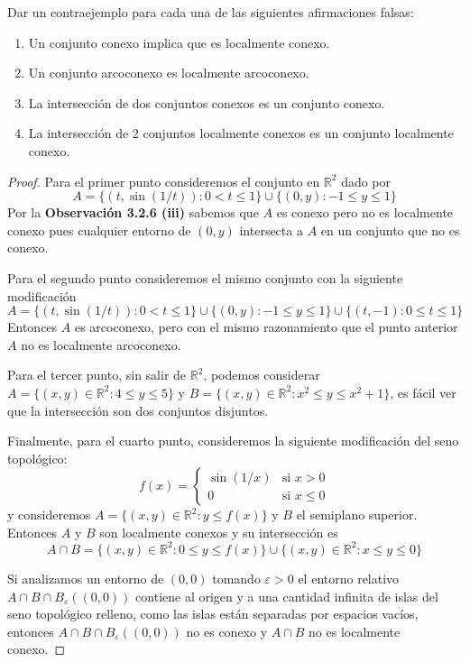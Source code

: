 \documentclass{article}
\theoremstyle{definition}
\newcommand{\R}{\mathbb{R}}
\newenvironment{ejercicio}[1]{\begin{trivlist}
\item[\hskip \labelsep {\bfseries Ejercicio}\hskip \labelsep {\bfseries #1.}]}{\end{trivlist}}
\begin{document}
\begin{ejercicio}{5}
    Dar un contraejemplo para cada una de las siguientes afirmaciones falsas:
    \begin{enumerate}
        \item Un conjunto conexo implica que es localmente conexo.
        \item Un conjunto arcoconexo es localmente arcoconexo.
        \item La intersección de dos conjuntos conexos es un conjunto conexo.
        \item La intersección de 2 conjuntos localmente conexos es un conjunto localmente conexo.
    \end{enumerate}
\end{ejercicio}
\begin{proof}
    Para el primer punto consideremos el conjunto en \( \R^2 \) dado por \[ A = \{ (t, \sin(1/t)) : 0 < t \leq 1 \} \cup \{ (0, y) : -1 \leq y \leq 1 \} \] Por la \textbf{Observación 3.2.6 (iii)} sabemos que \( A \) es conexo
    pero no es localmente conexo pues cualquier entorno de \( (0, y) \) intersecta a \( A \) en un conjunto que no es conexo.

    Para el segundo punto consideremos el mismo conjunto con la siguiente modificación \[ A = \{ (t, \sin(1/t)) : 0 < t \leq 1 \} \cup \{ (0, y) : -1 \leq y \leq 1 \} \cup \{ (t, -1) : 0 \leq t \leq 1 \} \]
    Entonces \( A \) es arcoconexo, pero con el mismo razonamiento que el punto anterior \( A \) no es localmente arcoconexo.

    Para el tercer punto, sin salir de \( \R^2 \), podemos considerar \( A = \{ (x, y) \in \R^2 : 4 \leq y \leq 5 \} \) y
    \( B = \{ (x, y) \in \R^2 : x^2 \leq y \leq x^2 + 1 \} \), es fácil ver que la intersección son dos conjuntos disjuntos.

    Finalmente, para el cuarto punto, consideremos la siguiente modificación del seno topológico:\begin{equation*}
        f(x) = \begin{cases}
            \sin(1/x) & \text{si } x > 0    \\
            0         & \text{si } x \leq 0
        \end{cases}
    \end{equation*}
    y consideremos \( A = \{ (x, y) \in \R^2 : y \leq f(x) \} \) y \( B \) el semiplano superior. Entonces \( A \) y \( B \) son localmente conexos y su intersección es \[
        A \cap B = \{ (x, y) \in \R^2 : 0 \leq y \leq f(x) \} \cup \{ (x, y) \in \R^2 : x \leq y \leq 0 \}
    \]

    Si analizamos un entorno de \( (0, 0) \) tomando \( \varepsilon > 0 \) el entorno relativo \( A \cap B \cap B_{\varepsilon}((0, 0)) \) contiene al origen y a una cantidad infinita de islas del seno topológico relleno, como las islas están separadas
    por espacios vacíos, entonces \( A \cap B \cap B_{\varepsilon}((0, 0)) \) no es conexo y \( A \cap B \) no es localmente conexo.
\end{proof}
\end{document}
